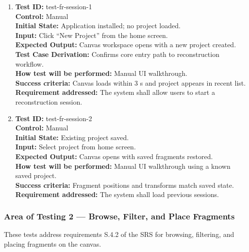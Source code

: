 \documentclass[12pt, titlepage]{article}
\begin{document}
\begin{enumerate}
    \item
    \textbf{Test ID:} test-fr-session-1\\
    \textbf{Control:} Manual\\
    \textbf{Initial State:} Application installed; no project loaded.\\
    \textbf{Input:} Click ``New Project'' from the home screen.\\
    \textbf{Expected Output:} Canvas workspace opens with a new project created.\\
    \textbf{Test Case Derivation:} Confirms core entry path to reconstruction workflow.\\
    \textbf{How test will be performed:} Manual UI walkthrough.\\
    \textbf{Success criteria:} Canvas loads within 3 s and project appears in recent list.\\
    \textbf{Requirement addressed:} The system shall allow users to start a reconstruction session.\\

    \item
    \textbf{Test ID:} test-fr-session-2\\
    \textbf{Control:} Manual\\
    \textbf{Initial State:} Existing project saved.\\
    \textbf{Input:} Select project from home screen.\\
    \textbf{Expected Output:} Canvas opens with saved fragments restored.\\
    \textbf{How test will be performed:} Manual UI walkthrough using a known saved project.\\
    \textbf{Success criteria:} Fragment positions and transforms match saved state.\\
    \textbf{Requirement addressed:} The system shall load previous sessions.\\
\end{enumerate}

\subsubsection{Area of Testing 2 — Browse, Filter, and Place Fragments}

These tests address requirements S.4.2 of the SRS for browsing, filtering, and placing fragments on the canvas.
\end{document}
